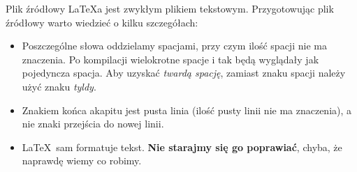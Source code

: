 Plik źródłowy \LaTeX a jest zwykłym plikiem tekstowym. Przygotowując plik %
źródłowy warto wiedzieć o kilku szczegółach:

\begin{itemize}
\item
Poszczególne słowa oddzielamy spacjami, przy czym ilość spacji nie ma znaczenia.
Po kompilacji wielokrotne spacje i tak będą wyglądały jak pojedyncza spacja.
Aby uzyskać {\em twardą spację}, zamiast znaku spacji należy użyć znaku {\em
tyldy}.

\item
Znakiem końca akapitu jest pusta linia (ilość pusty linii nie ma znaczenia), a
nie znaki przejścia do nowej linii.

\item
\LaTeX~sam formatuje tekst. \textbf{Nie starajmy się go poprawiać}, chyba, że
naprawdę wiemy co robimy.
\end{itemize} 


